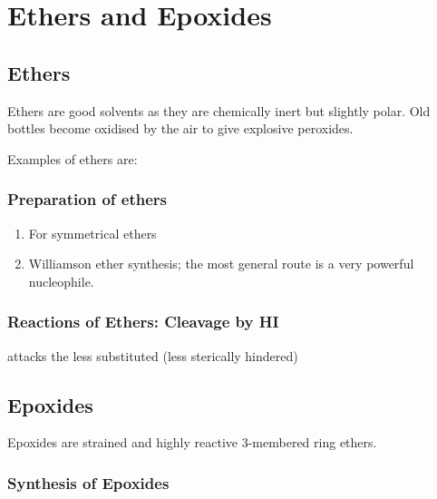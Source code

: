 \section{Ethers and Epoxides}

\subsection{Ethers}

Ethers are good solvents as they are chemically inert but slightly polar. Old
bottles become oxidised by the air to give explosive peroxides.

Examples of ethers are:


\subsubsection{Preparation of ethers}

\begin{enumerate}[label=\alph*)]

  \item For symmetrical ethers

  \item Williamson ether synthesis; the most general route
     is a very powerful nucleophile.

\end{enumerate}

\subsubsection{Reactions of Ethers: Cleavage by HI}

 attacks the less substituted (less sterically hindered) 


\subsection{Epoxides}

Epoxides are strained and highly reactive 3-membered ring ethers.

\subsubsection{Synthesis of Epoxides}

